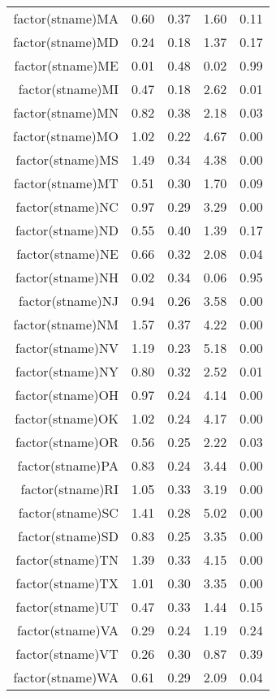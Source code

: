 \begin{table}[ht]
\begin{tabular}{rrrrr}
  factor(stname)MA & 0.60 & 0.37 & 1.60 & 0.11 \\ 
  factor(stname)MD & 0.24 & 0.18 & 1.37 & 0.17 \\ 
  factor(stname)ME & 0.01 & 0.48 & 0.02 & 0.99 \\ 
  factor(stname)MI & 0.47 & 0.18 & 2.62 & 0.01 \\ 
  factor(stname)MN & 0.82 & 0.38 & 2.18 & 0.03 \\ 
  factor(stname)MO & 1.02 & 0.22 & 4.67 & 0.00 \\ 
  factor(stname)MS & 1.49 & 0.34 & 4.38 & 0.00 \\ 
  factor(stname)MT & 0.51 & 0.30 & 1.70 & 0.09 \\ 
  factor(stname)NC & 0.97 & 0.29 & 3.29 & 0.00 \\ 
  factor(stname)ND & 0.55 & 0.40 & 1.39 & 0.17 \\ 
  factor(stname)NE & 0.66 & 0.32 & 2.08 & 0.04 \\ 
  factor(stname)NH & 0.02 & 0.34 & 0.06 & 0.95 \\ 
  factor(stname)NJ & 0.94 & 0.26 & 3.58 & 0.00 \\ 
  factor(stname)NM & 1.57 & 0.37 & 4.22 & 0.00 \\ 
  factor(stname)NV & 1.19 & 0.23 & 5.18 & 0.00 \\ 
  factor(stname)NY & 0.80 & 0.32 & 2.52 & 0.01 \\ 
  factor(stname)OH & 0.97 & 0.24 & 4.14 & 0.00 \\ 
  factor(stname)OK & 1.02 & 0.24 & 4.17 & 0.00 \\ 
  factor(stname)OR & 0.56 & 0.25 & 2.22 & 0.03 \\ 
  factor(stname)PA & 0.83 & 0.24 & 3.44 & 0.00 \\ 
  factor(stname)RI & 1.05 & 0.33 & 3.19 & 0.00 \\ 
  factor(stname)SC & 1.41 & 0.28 & 5.02 & 0.00 \\ 
  factor(stname)SD & 0.83 & 0.25 & 3.35 & 0.00 \\ 
  factor(stname)TN & 1.39 & 0.33 & 4.15 & 0.00 \\ 
  factor(stname)TX & 1.01 & 0.30 & 3.35 & 0.00 \\ 
  factor(stname)UT & 0.47 & 0.33 & 1.44 & 0.15 \\ 
  factor(stname)VA & 0.29 & 0.24 & 1.19 & 0.24 \\ 
  factor(stname)VT & 0.26 & 0.30 & 0.87 & 0.39 \\ 
  factor(stname)WA & 0.61 & 0.29 & 2.09 & 0.04 \\ 

\end{tabular}
\end{table}
